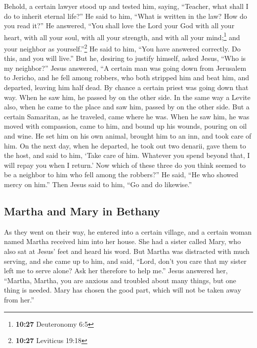 \begin{paracol}{2}
\begin{otherlanguage}{english}
 Behold, a certain lawyer stood up and tested him,
saying, ``Teacher, what shall I do to inherit eternal life?''
 He said to him, ``What is written in the law? How do you
read it?''  He answered, ``You shall love the Lord your
God with all your heart, with all your soul, with all your strength, and
with all your mind;\footnote{\textbf{10:27} Deuteronomy 6:5} and your
neighbor as yourself.''\footnote{\textbf{10:27} Leviticus 19:18}
 He said to him, ``You have answered correctly. Do this,
and you will live.''  But he, desiring to justify
himself, asked Jesus, ``Who is my neighbor?''  Jesus
answered, ``A certain man was going down from Jerusalem to Jericho, and
he fell among robbers, who both stripped him and beat him, and departed,
leaving him half dead.  By chance a certain priest was
going down that way. When he saw him, he passed by on the other side.
 In the same way a Levite also, when he came to the place
and saw him, passed by on the other side.  But a certain
Samaritan, as he traveled, came where he was. When he saw him, he was
moved with compassion,  came to him, and bound up his
wounds, pouring on oil and wine. He set him on his own animal, brought
him to an inn, and took care of him.  On the next day,
when he departed, he took out two denarii, gave them to the host, and
said to him, `Take care of him. Whatever you spend beyond that, I will
repay you when I return.'  Now which of these three do
you think seemed to be a neighbor to him who fell among the robbers?''
 He said, ``He who showed mercy on him.'' Then Jesus said
to him, ``Go and do likewise.''

\hypertarget{martha-and-mary-in-bethany}{%
\subsection{Martha and Mary in
Bethany}\label{martha-and-mary-in-bethany}}

 As they went on their way, he entered into a certain
village, and a certain woman named Martha received him into her house.
 She had a sister called Mary, who also sat at Jesus'
feet and heard his word.  But Martha was distracted with
much serving, and she came up to him, and said, ``Lord, don't you care
that my sister left me to serve alone? Ask her therefore to help me.''
 Jesus answered her, ``Martha, Martha, you are anxious
and troubled about many things,  but one thing is needed.
Mary has chosen the good part, which will not be taken away from her.''


\end{otherlanguage}
\end{paracol}
